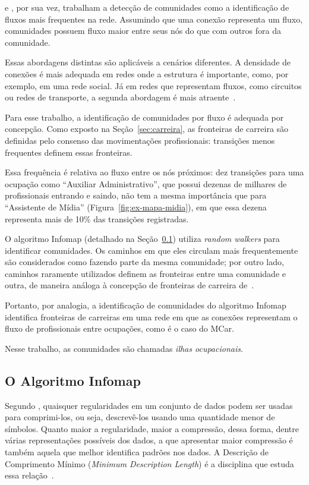 \documentclass[
  article,
  11pt,
  a4paper,
  english,
  brazil,
  sumario=tradicional]{abntex2}
\begin{document}
 e , por sua vez, trabalham a detecção de comunidades como a identificação de fluxos mais frequentes na rede. Assumindo que uma conexão representa um fluxo, comunidades possuem fluxo maior entre seus nós do que com outros fora da comunidade.

Essas abordagens distintas são aplicáveis a cenários diferentes. A densidade de conexões é mais adequada em redes onde a estrutura é importante, como, por exemplo, em uma rede social. Já em redes que representam fluxos, como circuitos ou redes de transporte, a segunda abordagem é mais atraente~\cite{Rosvall2009-sd}.

Para esse trabalho, a identificação de comunidades por fluxo é adequada por concepção. Como exposto na Seção~\ref{sec:carreira}, as fronteiras de carreira são definidas pelo consenso das movimentações profissionais: transições menos frequentes definem essas fronteiras.

Essa frequência é relativa ao fluxo entre os nós próximos: dez transições para uma ocupação como \enquote{Auxiliar Administrativo}, que possui dezenas de milhares de profissionais entrando e saindo, não tem a mesma importância que para \enquote{Assistente de Mídia} (Figura~\ref{fig:ex-mapa-midia}), em que essa dezena representa mais de 10\% das transições registradas.

O algoritmo Infomap (detalhado na Seção~\ref{sec:infomap}) utiliza \textit{random walkers} para identificar comunidades. Os caminhos em que eles circulam mais frequentemente são considerados como fazendo parte da mesma comunidade; por outro lado, caminhos raramente utilizados definem as fronteiras entre uma comunidade e outra, de maneira análoga à concepção de fronteiras de carreira de~.

Portanto, por analogia, a identificação de comunidades do algoritmo Infomap identifica fronteiras de carreiras em uma rede em que as conexões representam o fluxo de profissionais entre ocupações, como é o caso do MCar.

Nesse trabalho, as comunidades são chamadas \textit{ilhas ocupacionais}.

\subsection{O Algoritmo Infomap} \label{sec:infomap}

Segundo , quaisquer regularidades em um conjunto de dados podem ser usadas para comprimi-los, ou seja, descrevê-los usando uma quantidade menor de símbolos. Quanto maior a regularidade, maior a compressão, dessa forma, dentre várias representações possíveis dos dados, a que apresentar maior compressão é também aquela que melhor identifica padrões nos dados. A Descrição de Comprimento Mínimo (\textit{Minimum Description Length}) é a disciplina que estuda essa relação~\cite{Grunwald2007-bt}.
\end{document}
